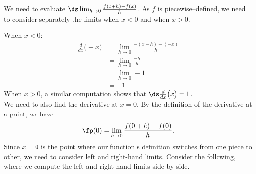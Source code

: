 {We need to evaluate $\ds \lim_{h\to0}\frac{f(x+h)-f(x)}{h}.$ As $f$ is piecewise--defined, we need to consider separately the limits when $x<0$ and when $x>0$. \\


When $x<0$:
	\begin{align*}
	\frac{d}{dx}\big(-x\big) 	&= \lim_{h\to 0}\frac{-(x+h) - (-x)}{h} \\
														&=	\lim_{h\to 0}\frac{-h}{h}\\
														&=	\lim_{h\to 0}-1 \\
														&=	-1.
	\end{align*}
When $x>0$, a similar computation shows that $\ds \frac{d}{dx}\big(x\big) = 1$. \\

We need to also find the derivative at $x=0$. By the definition of the derivative at a point, we have $$\fp(0) = \lim_{h\to0}\frac{f(0+h)-f(0)}{h}.$$ Since $x=0$ is the point where our function's definition switches from one piece to other, we need to consider left and right-hand limits. Consider the following, where we compute the left and right hand limits side by side.

}
